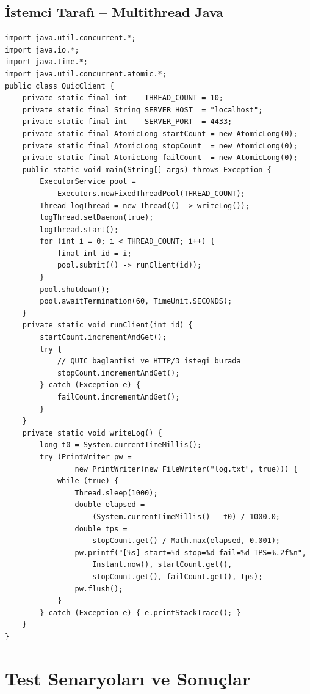 \documentclass[12pt,a4paper]{article}
\begin{document}
\subsection{İstemci Tarafı -- Multithread Java}
\begin{lstlisting}[caption={QuicClient.java -- Multithread istemci}]
import java.util.concurrent.*;
import java.io.*;
import java.time.*;
import java.util.concurrent.atomic.*;
public class QuicClient {
    private static final int    THREAD_COUNT = 10;
    private static final String SERVER_HOST  = "localhost";
    private static final int    SERVER_PORT  = 4433;
    private static final AtomicLong startCount = new AtomicLong(0);
    private static final AtomicLong stopCount  = new AtomicLong(0);
    private static final AtomicLong failCount  = new AtomicLong(0);
    public static void main(String[] args) throws Exception {
        ExecutorService pool =
            Executors.newFixedThreadPool(THREAD_COUNT);
        Thread logThread = new Thread(() -> writeLog());
        logThread.setDaemon(true);
        logThread.start();
        for (int i = 0; i < THREAD_COUNT; i++) {
            final int id = i;
            pool.submit(() -> runClient(id));
        }
        pool.shutdown();
        pool.awaitTermination(60, TimeUnit.SECONDS);
    }
    private static void runClient(int id) {
        startCount.incrementAndGet();
        try {
            // QUIC baglantisi ve HTTP/3 istegi burada
            stopCount.incrementAndGet();
        } catch (Exception e) {
            failCount.incrementAndGet();
        }
    }
    private static void writeLog() {
        long t0 = System.currentTimeMillis();
        try (PrintWriter pw =
                new PrintWriter(new FileWriter("log.txt", true))) {
            while (true) {
                Thread.sleep(1000);
                double elapsed =
                    (System.currentTimeMillis() - t0) / 1000.0;
                double tps =
                    stopCount.get() / Math.max(elapsed, 0.001);
                pw.printf("[%s] start=%d stop=%d fail=%d TPS=%.2f%n",
                    Instant.now(), startCount.get(),
                    stopCount.get(), failCount.get(), tps);
                pw.flush();
            }
        } catch (Exception e) { e.printStackTrace(); }
    }
}
\end{lstlisting}
\section{Test Senaryoları ve Sonuçlar}
\end{document}
